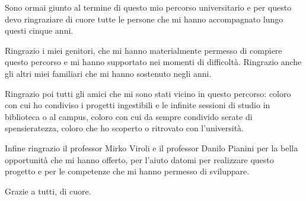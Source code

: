 

Sono ormai giunto al termine di questo mio percorso universitario
e per questo devo ringraziare di cuore tutte le persone che mi hanno accompagnato lungo questi cinque anni.

Ringrazio i miei genitori, che mi hanno materialmente permesso di compiere questo percorso e mi hanno supportato nei momenti di difficoltà.
Ringrazio anche gli altri miei familiari che mi hanno sostenuto negli anni.

Ringrazio poi tutti gli amici che mi sono stati vicino in questo percorso:
coloro con cui ho condiviso i progetti ingestibili e le infinite sessioni di studio in biblioteca o al campus,
coloro con cui da sempre condivido serate di spensieratezza,
coloro che ho scoperto o ritrovato con l'università.

Infine ringrazio il professor Mirko Viroli e il professor Danilo Pianini
per la bella opportunità che mi hanno offerto,
per l'aiuto datomi per realizzare questo progetto
e per le competenze che mi hanno permesso di sviluppare.

Grazie a tutti, di cuore.
